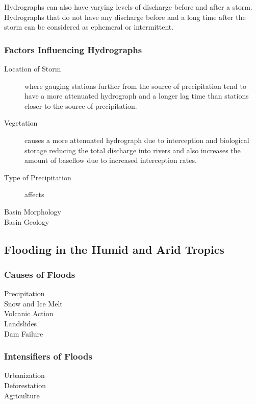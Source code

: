 \documentclass[../../main]{subfiles}
\begin{document}
	Hydrographs can also have varying levels of discharge before and after a storm. Hydrographs that do not have any discharge before and a long time after the storm can be considered as ephemeral or intermittent.

\subsubsection{Factors Influencing Hydrographs}

	\begin{description}
		\item[Location of Storm] where gauging stations further from the source of precipitation tend to have a more attenuated hydrograph and a longer lag time than stations closer to the source of precipitation.
		\item[Vegetation] causes a more attenuated hydrograph due to interception and biological storage reducing the total discharge into rivers and also increases the amount of baseflow due to increased interception rates.
		\item[Type of Precipitation] affects 
		\item[Basin Morphology]
		\item[Basin Geology]
	\end{description}

\subsection{Flooding in the Humid and Arid Tropics}

\subsubsection{Causes of Floods}

	\begin{description}
		\item[Precipitation]
		\item[Snow and Ice Melt]
		\item[Volcanic Action]
		\item[Landslides]
		\item[Dam Failure]
	\end{description}

\subsubsection{Intensifiers of Floods}

	\begin{description}
		\item[Urbanization]
		\item[Deforestation]
		\item[Agriculture]
	\end{description}
\end{document}

